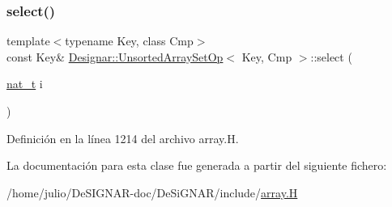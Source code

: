 \subsubsection{\texorpdfstring{select()}{select()}}
{\footnotesize\ttfamily template$<$typename Key, class Cmp$>$ \\
const Key\& \hyperlink{class_designar_1_1_unsorted_array_set_op}{Designar\+::\+Unsorted\+Array\+Set\+Op}$<$ Key, Cmp $>$\+::select (\begin{DoxyParamCaption}\item[{\hyperlink{namespace_designar_aa72662848b9f4815e7bf31a7cf3e33d1}{nat\+\_\+t}}]{i }\end{DoxyParamCaption})\hspace{0.3cm}{\ttfamily [inline]}}



Definición en la línea 1214 del archivo array.\+H.



La documentación para esta clase fue generada a partir del siguiente fichero\+:\begin{DoxyCompactItemize}
\item 
/home/julio/\+De\+S\+I\+G\+N\+A\+R-\/doc/\+De\+Si\+G\+N\+A\+R/include/\hyperlink{array_8_h}{array.\+H}\end{DoxyCompactItemize}
